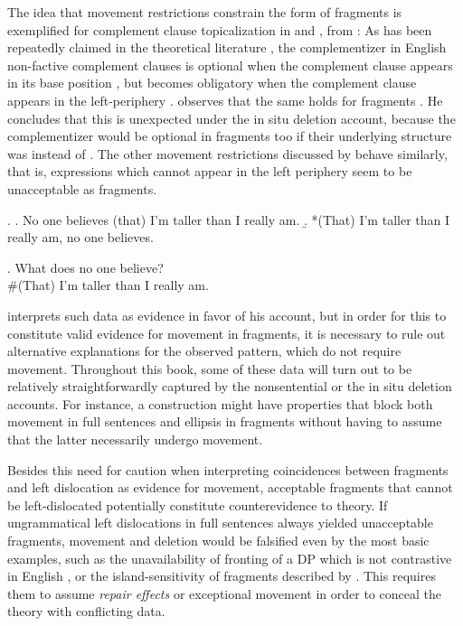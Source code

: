 The idea that movement restrictions constrain the form of fragments is exemplified for complement clause topicalization in \Next and \NNext, from \citet[690]{merchant2004}: As has been repeatedly claimed in the theoretical literature \citep[see e.g.][]{morgan1973, chomsky1981, stowell1981, webelhuth1992}, the complementizer in English non-factive complement clauses is optional when the complement clause appears in its base position \Next[a], but becomes obligatory when the complement clause appears in the left-periphery \Next[b]. \citet{merchant2004} observes that the same holds for fragments \NNext. He concludes that this is unexpected under the in situ deletion account, because the complementizer would be optional in fragments too if their underlying structure was \Next[a] instead of \Next[b]. The other movement restrictions discussed by \citet{merchant2004} behave similarly, that is, expressions which cannot appear in the left periphery seem to be unacceptable as fragments. 

\ex. \label{ex:merchant.teacher-sent}
\a. No one believes (that) I’m taller than I really am. 
\b. *(That) I’m taller than I really am, no one believes.

\ex. \label{ex:merchant.teacher-frag}
What does no one believe? \hfill \citep[690]{merchant2004}\\
\mbox{}\hspace{-.45em}\#(That) I’m taller than I really am.

\citet{merchant2004} interprets such data as evidence in favor of his account, but in order for this to constitute valid evidence for movement in fragments, it is necessary to rule out alternative explanations for the observed pattern, which do not require movement. Throughout this book, some of these data will turn out to be relatively straightforwardly captured by the nonsentential or the in situ deletion accounts. For instance, a construction might have properties that block both movement in full sentences and ellipsis in fragments without having to assume that the latter necessarily undergo movement.

Besides this need for caution when interpreting coincidences between fragments and left dislocation as evidence for movement, acceptable fragments that cannot be left-dislocated potentially constitute counterevidence to  theory. If ungrammatical left dislocations in full sentences always yielded unacceptable fragments, movement and deletion would be falsified even by the most basic examples, such as the unavailability of fronting of a DP which is not contrastive in English \citep{weir2014}, or the island-sensitivity of fragments described by \citet{merchant2004}. This requires them to assume \textit{repair effects} \citep{merchant2004} or exceptional movement \citep{weir2014} in order to conceal the theory with conflicting data.

